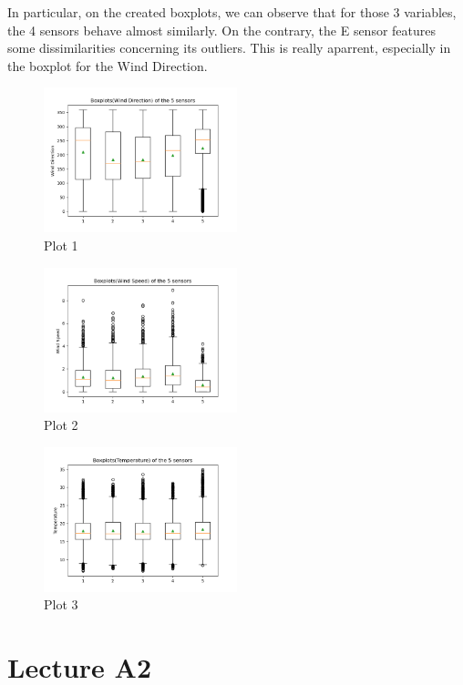 \documentclass[a4paper,12pt]{article} %
\begin{document}
\setlength{\parindent}{8ex}In particular, on the created boxplots, we can observe that for those 3 variables, the 4 sensors behave almost similarly. On the contrary, the E sensor features some dissimilarities concerning its outliers. This is really aparrent, especially in the boxplot for the Wind Direction.
 \begin{figure}[H]   
	\centering 
	\includegraphics[width=0.5\textwidth]{Figure_4.png}
	\caption{Plot 1} 
\end{figure}
 \begin{figure}[H]   
	\centering 
	\includegraphics[width=0.5\textwidth]{Figure_5.png}
	\caption{Plot 2} 
\end{figure}
 \begin{figure}[H]   
	\centering 
	\includegraphics[width=0.5\textwidth]{Figure_6.png}
	\caption{Plot 3} 
\end{figure}
\section{Lecture A2}
\vspace{10mm}
\end{document}

